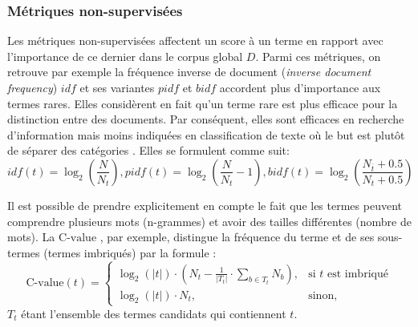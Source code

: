 
\subsubsection{Métriques non-supervisées}
Les métriques non-supervisées affectent un score à un terme en rapport avec l'importance de ce dernier dans le corpus global $D$. Parmi ces métriques, on retrouve par exemple la fréquence inverse de document (\textit{inverse document frequency}) $idf$ \citep{sparck1972idf} et ses variantes $pidf$ \citep{wu1981pidf}  et $bidf$ \citep{jones2000bm25idf} accordent plus d'importance aux termes rares. Elles considèrent en fait qu'un terme rare est plus efficace pour la distinction entre des documents. Par conséquent, elles sont efficaces en recherche d'information mais moins indiquées en classification de texte où le but est plutôt de séparer des catégories \citep{wu2017balancingtermweight}. Elles se formulent comme suit:
\[idf(t) = \log_2\left(\frac{N}{N_t}\right), pidf(t) = \log_2\left(\frac{N}{N_t} - 1\right), bidf(t) = \log_2\left(\frac{N_{\overline{t}} + 0.5}{N_t + 0.5}\right)\]

Il est possible de prendre explicitement en compte le fait que les termes peuvent comprendre plusieurs mots (n-grammes) et avoir des tailles différentes (nombre de mots). La $\text{C-value}$ \citep{frantzi2000CValueNCValue}, par exemple, distingue la fréquence du terme et de ses sous-termes (termes imbriqués) par la formule : %
\[\text{C-value}(t) = \begin{cases} \log_2(\vert t \vert) \cdot (N_t - \frac{1}{\vert T_t \vert} \cdot \sum\limits_{b \in T_t} N_b), & \mbox{si } t \mbox{ est imbriqué} \\ \log_2(\vert t \vert) \cdot N_t, & \mbox{sinon,} \end{cases}\]
$T_t$ étant l'ensemble des termes candidats qui contiennent $t$.



